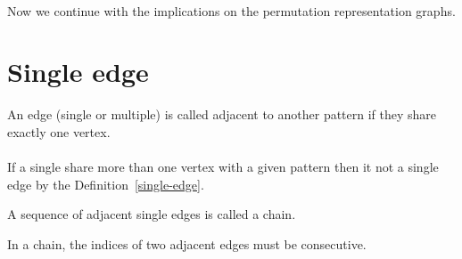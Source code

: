 \paragraph{}
Now we continue with the implications on the permutation representation graphs.

\section{Single edge}

\begin{definition}
  An edge (single or multiple) is called adjacent to another pattern if they share exactly one vertex.
\end{definition}

\paragraph{}
If a single share more than one vertex with a given pattern then it not a single edge by the Definition~\ref{single-edge}.

\begin{definition}
  A sequence of adjacent single edges is called a chain.
\end{definition}

\begin{proposition}
  \label{chain-consecutive}
  In a chain, the indices of two adjacent edges must be consecutive.
\end{proposition}

